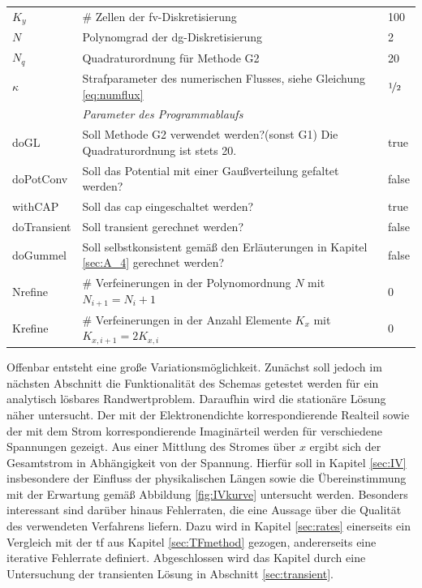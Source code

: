 \begin{table}
\begin{tabular}{p{} p{} p{}  }
    $K_y$ & \# Zellen der \ac{fv}-Diskretisierung & 100 \\
    $N$ & Polynomgrad der \ac{dg}-Diskretisierung & 2 \\
    $N_q$ & Quadraturordnung für Methode G2 & 20 \\
    $\kappa$ & Strafparameter des numerischen Flusses, siehe Gleichung \eqref{eq:numflux} &$\nicefrac{1}{2}$ \\
    \midrule
     & \emph{Parameter des Programmablaufs} & \\
    doGL & Soll Methode G2 verwendet werden?(sonst G1) Die Quadraturordnung ist stets 20. & true \\
    doPotConv & Soll das Potential mit einer Gaußverteilung gefaltet werden? & false\\
    withCAP & Soll das \ac{cap} eingeschaltet werden? & true \\
    doTransient & Soll transient gerechnet werden? & false \\
    doGummel & Soll selbstkonsistent gemäß den Erläuterungen in Kapitel \ref{sec:A_4} gerechnet werden? & false \\
    Nrefine  & \# Verfeinerungen in der Polynomordnung $N$ mit $N_{i+1}=N_i+1$ & 0 \\
    Krefine  & \# Verfeinerungen in der Anzahl Elemente $K_x$ mit $K_{x,i+1}=2K_{x,i}$ & 0 \\
    \bottomrule
  \end{tabular}
\end{table}
Offenbar entsteht eine große Variationsmöglichkeit. Zunächst soll jedoch im nächsten Abschnitt die Funktionalität des Schemas getestet werden für ein analytisch lösbares Randwertproblem. Daraufhin wird die stationäre Lösung näher untersucht. Der mit der Elektronendichte korrespondierende Realteil sowie der mit dem Strom korrespondierende Imaginärteil werden für verschiedene Spannungen gezeigt. Aus einer Mittlung des Stromes über $x$ ergibt sich der Gesamtstrom in Abhängigkeit von der Spannung. Hierfür soll in Kapitel \ref{sec:IV} insbesondere der Einfluss der physikalischen Längen sowie die Übereinstimmung mit der Erwartung gemäß Abbildung \ref{fig:IVkurve} untersucht werden. Besonders interessant sind darüber hinaus Fehlerraten, die eine Aussage über die Qualität des verwendeten Verfahrens liefern. Dazu wird in Kapitel \ref{sec:rates} einerseits ein Vergleich mit der \ac{tf} aus Kapitel \ref{sec:TFmethod} gezogen, andererseits eine iterative Fehlerrate definiert. Abgeschlossen wird das Kapitel durch eine Untersuchung der transienten Lösung in Abschnitt \ref{sec:transient}.

